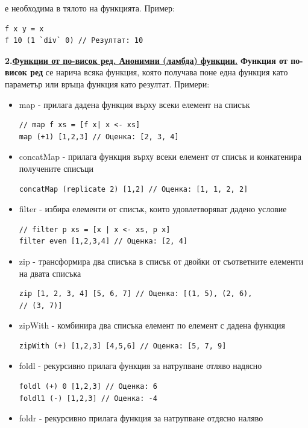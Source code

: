 \documentclass{article}
\begin{document}
е необходима в тялото на функцията. Пример:
\begin{lstlisting}[style=cpp]
f x y = x
f 10 (1 `div` 0) // Резултат: 10
\end{lstlisting}
\textbf{2.\underline{Функции от по-висок ред. Анонимни (ламбда) функции.}} \newline\newline
\textbf{Функция от по-висок ред} се нарича всяка функция, която получава поне една функция като параметър или връща функция
като резултат. \newline\newline
Примери:
\begin{itemize}
    \item map - прилага дадена функция върху всеки елемент на списък
\begin{lstlisting}[style=cpp]
// map f xs = [f x| x <- xs]
map (+1) [1,2,3] // Оценка: [2, 3, 4]
\end{lstlisting}
    \item concatMap - прилага функция върху всеки елемент от списък и конкатенира получените списъци
\begin{lstlisting}[style=cpp]
concatMap (replicate 2) [1,2] // Оценка: [1, 1, 2, 2]
\end{lstlisting}
    \item filter - избира елементи от списък, които удовлетворяват дадено условие
\begin{lstlisting}[style=cpp]
// filter p xs = [x | x <- xs, p x]
filter even [1,2,3,4] // Оценка: [2, 4]
\end{lstlisting}
    \item zip - трансформира два списъка в списък от двойки от съответните елементи на двата списъка
\begin{lstlisting}[style=cpp]
zip [1, 2, 3, 4] [5, 6, 7] // Оценка: [(1, 5), (2, 6),
// (3, 7)]
\end{lstlisting}
    \item zipWith - комбинира два списъка елемент по елемент с дадена функция
\begin{lstlisting}[style=cpp]
zipWith (+) [1,2,3] [4,5,6] // Оценка: [5, 7, 9]
\end{lstlisting}
    \item foldl - рекурсивно прилага функция за натрупване отляво надясно
\begin{lstlisting}[style=cpp]
foldl (+) 0 [1,2,3] // Оценка: 6
foldl1 (-) [1,2,3] // Оценка: -4
\end{lstlisting}
    \item foldr - рекурсивно прилага функция за натрупване отдясно наляво

\end{itemize}
\end{document}

